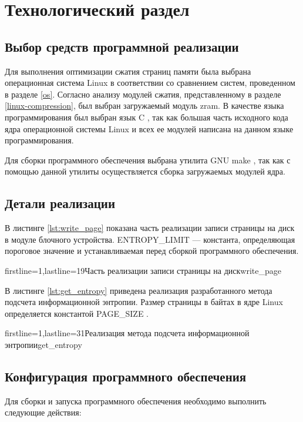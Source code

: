 \chapter{Технологический раздел}\label{implementation}

\section{Выбор средств программной реализации}

Для выполнения оптимизации сжатия страниц памяти была выбрана операционная система Linux в соответствии со сравнением систем, проведенном в разделе \ref{os}. Согласно анализу модулей сжатия, представленному в разделе \ref{linux-compression}, был выбран загружаемый модуль zram. В качестве языка программирования был выбран язык C \cite{c}, так как большая часть исходного кода ядра операционной системы Linux и всех ее модулей написана на данном языке программирования.

Для сборки программного обеспечения выбрана утилита GNU make \cite{make}, так как с помощью данной утилиты осуществляется сборка загружаемых модулей ядра.

\section{Детали реализации}

В листинге \ref{lst:write_page} показана часть реализации записи страницы на диск в модуле блочного устройства. ENTROPY\_LIMIT --- константа, определяющая пороговое значение и устанавливаемая перед сборкой программного обеспечения.

    {firstline=1,lastline=19}{Часть реализации записи страницы на диск}{write_page}{}

В листинге \ref{lst:get_entropy} приведена реализация разработанного метода подсчета информационной энтропии. Размер страницы в байтах в ядре Linux определяется константой PAGE\_SIZE \cite{block-file}.

    {firstline=1,lastline=31}{Реализация метода подсчета информационной энтропии}{get_entropy}{}

\section{Конфигурация программного обеспечения}

Для сборки и запуска программного обеспечения необходимо выполнить следующие действия:

